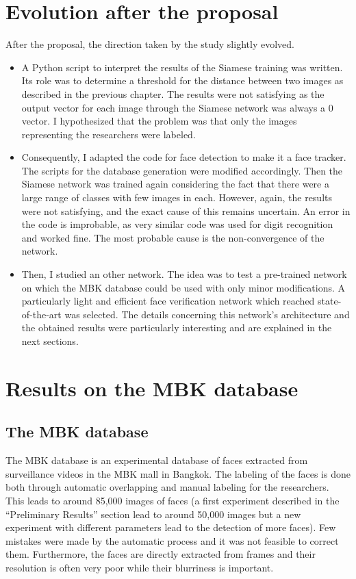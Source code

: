 \section{Evolution after the proposal}
After the proposal, the direction taken by the study slightly evolved.
\begin{itemize}
\item A Python script to interpret the results of the Siamese training was written. Its role was to determine a threshold for the distance between two images as described in the previous chapter. The results were not satisfying as the output vector for each image through the Siamese network was always a 0 vector. I hypothesized that the problem was that only the images representing the researchers were labeled.
\item Consequently, I adapted the code for face detection to make it a face tracker. The scripts for the database generation were modified accordingly. Then the Siamese network was trained again considering the fact that there were a large range of classes with few images in each. However, again, the results were not satisfying, and the exact cause of this remains uncertain. An error in the code is improbable, as very similar code was used for digit recognition and worked fine. The most probable cause is the non-convergence of the network.
\item Then, I studied an other network. The idea was to test a pre-trained network on which the MBK database could be used with only minor modifications. A particularly light and efficient face verification network which reached state-of-the-art was selected. The details concerning this network's architecture and the obtained results were particularly interesting and are explained in the next sections.
\end{itemize}

\section{Results on the MBK database}
\subsection{The MBK database}
The MBK database is an experimental database of faces extracted from surveillance videos in the MBK mall in Bangkok. The labeling of the faces is done both through automatic overlapping and manual labeling for the researchers. This leads to around 85,000 images of faces (a first experiment described in the \enquote{Preliminary Results} section lead to around 50,000 images but a new experiment with different parameters lead to the detection of more faces). Few mistakes were made by the automatic process and it was not feasible to correct them. Furthermore, the faces are directly extracted from frames and their resolution is often very poor while their blurriness is important. 
